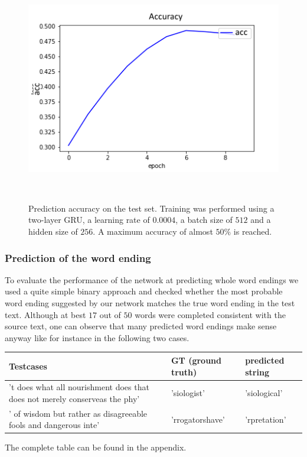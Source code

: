 \documentclass[11pt,a4paper,bibliography=totocnumbered,listof=totocnumbered]{scrartcl}
\begin{document}
\begin{figure}[!ht]
   \begin{minipage}{\textwidth}
     \centering
     \includegraphics[width=.4\textwidth]{acc_hs256_slow}
     \caption{Prediction accuracy on the test set. Training was performed using a two-layer GRU, a learning rate of $0.0004$, a batch size of $512$ and a hidden size of $256$. A maximum accuracy of almost $50\%$ is reached.}
     \label{fig:truenet}
   \end{minipage}\\[1em]   
\end{figure}

\subsubsection{Prediction of the word ending} \label{ssec:we}
To evaluate the performance of the network at predicting whole word endings we used a quite simple binary approach and checked whether the most probable word ending suggested by our network matches the true word ending in the test text. Although at best $17$ out of $50$ words were completed consistent with the source text, one can observe that many predicted word endings make sense anyway like for instance in the following two cases. \\

\begin{table}[!ht]
\footnotesize
\centering
\begin{tabularx}{\textwidth}{X|X|X}
\textbf{Testcases} & \textbf{GT (ground truth)} & \textbf{predicted string}\\
\toprule 
't does what all nourishment does that does not merely conserveas the phy' & 'siologist' & 'siological' \\
\hline
' of wisdom but rather as disagreeable fools and dangerous inte' & 'rrogatorshave' & 'rpretation' \\ 
\end{tabularx}
	\vskip 1pt
\end{table}

The complete table can be found in the appendix.
\end{document}
